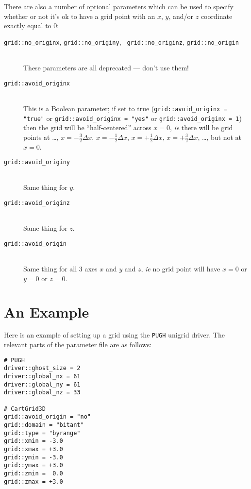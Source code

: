 \documentclass{article}
\begin{document}
There are also a number of optional parameters which can be used
to specify whether or not it's ok to have a grid point with an $x$,
$y$, and/or $z$ coordinate exactly equal to 0:
\begin{description}
\item[{\tt grid::no\_originx}, {\tt grid::no\_originy}, {\tt
grid::no\_originz}, {\tt grid::no\_origin}]\mbox{}\\
	These parameters are all deprecated --- don't use them!
\item[{\tt grid::avoid\_originx}]\mbox{}\\
	This is a Boolean parameter; if set to true
	(\verb|grid::avoid_originx = "true"| or
	\verb|grid::avoid_originx = "yes"| or
	\verb|grid::avoid_originx = 1|) then the grid will be
	``half-centered'' across $x=0$, {\it ie} there will be
	grid points at
	\dots,
	$x = - \frac{3}{2} \Delta x$,
	$x = - \frac{1}{2} \Delta x$,
	$x = + \frac{1}{2} \Delta x$,
	$x = + \frac{3}{2} \Delta x$,
	\dots,
	but not at $x=0$.
\item[{\tt grid::avoid\_originy}]\mbox{}\\
	Same thing for $y$.
\item[{\tt grid::avoid\_originz}]\mbox{}\\
	Same thing for $z$.
\item[{\tt grid::avoid\_origin}]\mbox{}\\
	Same thing for all 3 axes $x$ and $y$ and $z$, {\it ie}
	no grid point will have $x=0$ or $y=0$ or $z=0$.
\end{description}


\section{An Example}

Here is an example of setting up a grid using the {\tt PUGH} unigrid
driver.  The relevant parts of the parameter file are as follows:
\begin{verbatim}
# PUGH
driver::ghost_size = 2
driver::global_nx = 61
driver::global_ny = 61
driver::global_nz = 33

# CartGrid3D
grid::avoid_origin = "no"
grid::domain = "bitant"
grid::type = "byrange"
grid::xmin = -3.0
grid::xmax = +3.0
grid::ymin = -3.0
grid::ymax = +3.0
grid::zmin =  0.0
grid::zmax = +3.0
\end{verbatim}
\end{document}
